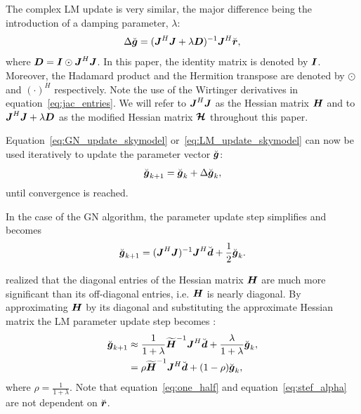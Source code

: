 \documentclass[useAMS,usenatbib]{mn2e}
\newcommand{\br}{\bmath{r}}
\newcommand{\bg}{\bmath{g}}
\newcommand{\bd}{\bmath{d}}
\newcommand{\bJ}{\bmath{J}}
\newcommand{\bD}{\bmath{D}}
\newcommand{\bH}{\bmath{H}}
\newcommand{\bI}{\bmath{I}}
\newcommand{\bmH}{\bmath{\mathcal{H}}}
\begin{document}
The complex LM update is very similar, the major difference being the introduction of a damping parameter, $\lambda$:
\begin{equation}
\label{eq:LM_update_skymodel}
\Delta \breve{\bg} = (\bJ^H\bJ + \lambda\bD)^{-1}\bJ^H\breve{\br},
\end{equation}
where $\bD=\bI\odot\bJ^H\bJ$. In this paper, the identity matrix is denoted by $\bI$. Moreover, the Hadamard product and the Hermition transpose are denoted by $\odot$ and $(\cdot)^H$ respectively. Note the use of the Wirtinger derivatives in equation~\ref{eq:jac_entries}.
We will refer to $\bJ^H\bJ$ as the Hessian matrix $\bH$ and to $\bJ^H\bJ + \lambda\bD$ as the modified Hessian matrix $\bmH$ throughout this paper. 

Equation~\ref{eq:GN_update_skymodel} or~\ref{eq:LM_update_skymodel} can now be used iteratively to update the parameter vector $\breve{\bg}$:
\begin{equation}
\label{eq:update_skymodel}
\breve{\bg}_{k+1} = \breve{\bg}_{k} + \Delta \breve{\bg}_{k},
\end{equation}
until convergence is reached.

In the case of the GN algorithm, the parameter update step simplifies and becomes \citep{Smirnov2015}
\begin{equation}
\label{eq:one_half}
\breve{\bg}_{k+1} = (\bJ^H\bJ)^{-1}\bJ^H\breve{\bd} + \frac{1}{2}\breve{\bg}_{k}. 
\end{equation}


\citet{Smirnov2015} realized that the diagonal entries of the Hessian matrix $\bH$ are much more significant than its off-diagonal entries, i.e. $\bH$ is nearly diagonal. By approximating $\bH$ by its diagonal and substituting the approximate Hessian matrix the LM parameter update step becomes \citep{Smirnov2015}:
\begin{align}
\breve{\bg}_{k+1} &\approx \frac{1}{1+\lambda}\widetilde{\bH}^{-1}\bJ^H\breve{\bd} + \frac{\lambda}{1+\lambda} \breve{\bg}_k, \nonumber \\
 &= \rho \widetilde{\bH}^{-1}\bJ^H\breve{\bd} + (1-\rho)\breve{\bg}_k, 
\label{eq:stef_alpha}  
\end{align}
where $\rho = \frac{1}{1+\lambda}$. Note that equation~\ref{eq:one_half} and equation~\ref{eq:stef_alpha} are   
not dependent on $\breve{\br}$. 
\end{document}
